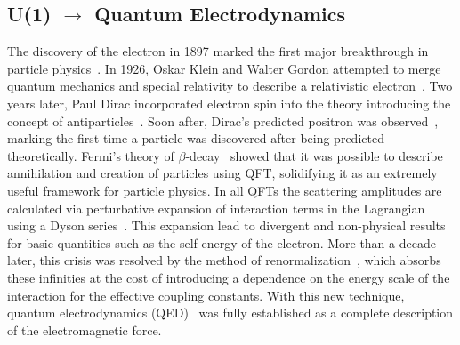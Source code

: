 \subsection{U(1) \texorpdfstring{$\rightarrow$}{-} Quantum Electrodynamics}

The discovery of the electron in 1897 marked the first major breakthrough in particle physics~\cite{ThomsonElectron}.
In 1926, Oskar Klein and Walter Gordon attempted to merge quantum mechanics and special relativity to describe a relativistic electron~\cite{Klein1926,Gordon1926}.
Two years later, Paul Dirac incorporated electron spin into the theory introducing the concept of antiparticles~\cite{Dirac1928}.
Soon after, Dirac's predicted positron was observed~\cite{PositiveElectron}, marking the first time a particle was discovered after being predicted theoretically.
Fermi's theory of $\beta$-decay~\cite{Fermi1934} showed that it was possible to describe annihilation and creation of particles using QFT\@, solidifying it as an extremely useful framework for particle physics.
In all QFTs the scattering amplitudes are calculated via perturbative expansion of interaction terms in the Lagrangian using a Dyson series~\cite{AlexQED4}.
This expansion lead to divergent and non-physical results for basic quantities such as the self-energy of the electron.
More than a decade later, this crisis was resolved by the method of renormalization~\cite{Renorm1,Renorm2,Renorm3,Renorm4,Renorm5,Renorm6,Renorm7,Renorm8,Renorm9,Renorm10,Renorm11,Renorm12}, which absorbs these infinities at the cost of introducing a dependence on the energy scale of the interaction for the effective coupling constants.
With this new technique, quantum electrodynamics (QED)~\cite{AlexQED1,AlexQED2,AlexQED3} was fully established as a complete description of the electromagnetic force.

